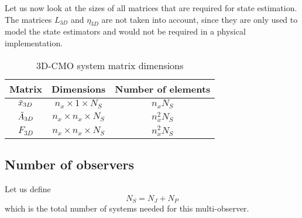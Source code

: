 Let us now look at the sizes of all matrices that are required for state estimation. The matrices $L_{3D}$ and $\eta_{3D}$ are not taken into account, since they are only used to model the state estimators and would not be required in a physical implementation.
\begin{table}[h]
    \centering
    \begin{tabular}{c|c|c}
       Matrix  & Dimensions & Number of elements \\ \hline
       $\Tilde{x}_{3D}$  & $ n_x \times 1 \times N_S$ & $n_xN_S$ \\
       $\Tilde{A}_{3D}$ & $n_x \times n_x \times N_S$ & $n_x^2N_S$ \\ 
       $F_{3D}$ & $n_x \times n_x \times N_S$ & $n_x^2N_S$ \\
       
    \end{tabular}
    \caption{3D-CMO system matrix dimensions}
    \label{tab:3D-CMO-dimensions}
\end{table}


\subsection{Number of observers}
Let us define
\begin{equation}
    N_S = N_J + N_P
\end{equation}
which is the total number of systems needed for this multi-observer.\\

